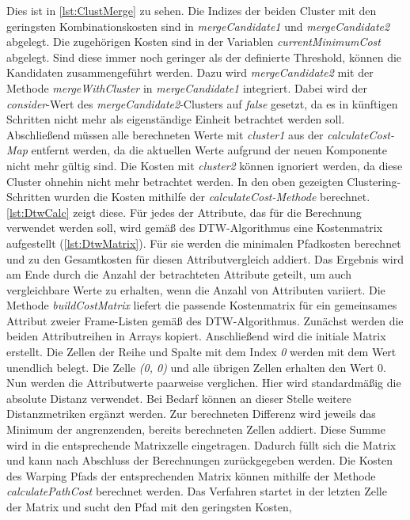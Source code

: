 Dies ist in \autoref{lst:ClustMerge} zu sehen.
Die Indizes der beiden Cluster mit den geringsten Kombinationskosten sind
in \emph{mergeCandidate1} und \emph{mergeCandidate2} abgelegt.
Die zugehörigen Kosten sind in der Variablen \emph{currentMinimumCost} abgelegt.
Sind diese immer noch geringer als der definierte Threshold, können die Kandidaten zusammengeführt werden.
Dazu wird \emph{mergeCandidate2} mit der Methode \emph{mergeWithCluster} in \emph{mergeCandidate1} integriert.
Dabei wird der \emph{consider}-Wert des \emph{mergeCandidate2}-Clusters auf \emph{false} gesetzt,
da es in künftigen Schritten nicht mehr als eigenständige Einheit betrachtet werden soll.
Abschließend müssen alle berechneten Werte mit \emph{cluster1} aus der \emph{calculateCost-Map} entfernt werden,
da die aktuellen Werte aufgrund der neuen Komponente nicht mehr gültig sind.
Die Kosten mit \emph{cluster2} können ignoriert werden, da diese Cluster ohnehin nicht mehr betrachtet werden.
In den oben gezeigten Clustering-Schritten wurden die Kosten mithilfe der \emph{calculateCost-Methode} berechnet.
\autoref{lst:DtwCalc} zeigt diese.
Für jedes der Attribute, das für die Berechnung verwendet werden soll, wird gemäß des \ac{DTW}-Algorithmus
eine Kostenmatrix aufgestellt (\autoref{lst:DtwMatrix}).
Für sie werden die minimalen Pfadkosten berechnet und zu den Gesamtkosten für diesen Attributvergleich addiert.
Das Ergebnis wird am Ende durch die Anzahl der betrachteten Attribute geteilt,
um auch vergleichbare Werte zu erhalten, wenn die Anzahl von Attributen variiert.
Die Methode \emph{buildCostMatrix} liefert die passende Kostenmatrix für ein gemeinsames Attribut
zweier Frame-Listen gemäß des \ac{DTW}-Algorithmus.
Zunächst werden die beiden Attributreihen in Arrays kopiert.
Anschließend wird die initiale Matrix erstellt.
Die Zellen der Reihe und Spalte mit dem Index \emph{0} werden mit dem Wert {\glqq unendlich\grqq} belegt.
Die Zelle \emph{(0, 0)} und alle übrigen Zellen erhalten den Wert 0.
Nun werden die Attributwerte paarweise verglichen.
Hier wird standardmäßig die absolute Distanz verwendet.
Bei Bedarf können an dieser Stelle weitere Distanzmetriken ergänzt werden.
Zur berechneten Differenz wird jeweils das Minimum der angrenzenden, bereits berechneten Zellen addiert.
Diese Summe wird in die entsprechende Matrixzelle eingetragen.
Dadurch füllt sich die Matrix und kann nach Abschluss der Berechnungen zurückgegeben werden.
Die Kosten des Warping Pfads der entsprechenden Matrix können mithilfe der Methode \emph{calculatePathCost}
berechnet werden.
Das Verfahren startet in der letzten Zelle der Matrix und sucht den Pfad mit den geringsten Kosten,
